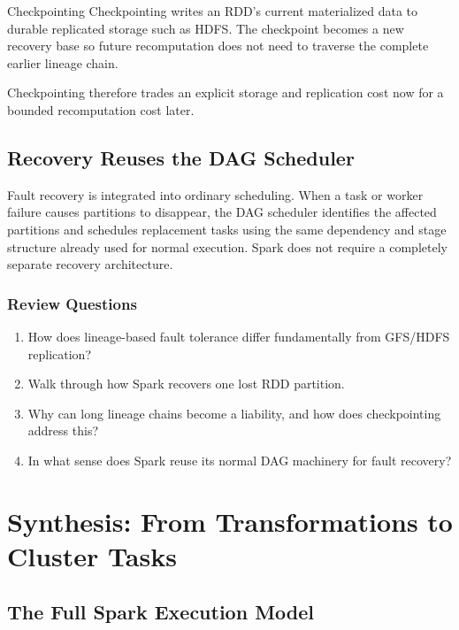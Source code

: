 \documentclass[11pt,a4paper,oneside]{book}
\begin{document}
\begin{definitionbox}{Checkpointing}
Checkpointing writes an RDD's current materialized data to durable replicated storage such as HDFS. The checkpoint becomes a new recovery base so future recomputation does not need to traverse the complete earlier lineage chain.
\end{definitionbox}

Checkpointing therefore trades an explicit storage and replication cost now for a bounded recomputation cost later.

\subsection{Recovery Reuses the DAG Scheduler}

Fault recovery is integrated into ordinary scheduling. When a task or worker failure causes partitions to disappear, the DAG scheduler identifies the affected partitions and schedules replacement tasks using the same dependency and stage structure already used for normal execution. Spark does not require a completely separate recovery architecture.

\subsubsection*{Review Questions}
\begin{enumerate}
    \item How does lineage-based fault tolerance differ fundamentally from GFS/HDFS replication?
    \item Walk through how Spark recovers one lost RDD partition.
    \item Why can long lineage chains become a liability, and how does checkpointing address this?
    \item In what sense does Spark reuse its normal DAG machinery for fault recovery?
\end{enumerate}

\section{Synthesis: From Transformations to Cluster Tasks}
\label{sec:spark-synthesis}

\subsection{The Full Spark Execution Model}
\end{document}
